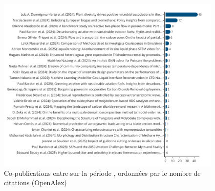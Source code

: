 \documentclass[french, 11pt]{dibiso/pubpart}
\begin{document}
\begin{figure}[!h]
  \includegraphics[width=\textwidth]{figures/works_collaborations_citationscount.pdf}
  \caption{Co-publications entre \entitiesacronym sur la période \reportyear, ordonnées par le nombre de citations (OpenAlex)}
  \label{fig_works_collaborations_citationscount}
\end{figure}

{\footnotesize\workscollaborationscitationscountinfo}




\makelastpagereport
 
\end{document}
